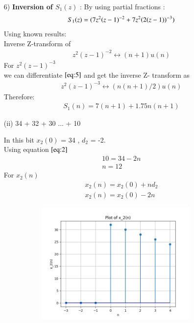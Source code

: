 \documentclass[journal,12pt,twocolumn]{IEEEtran}
\theoremstyle{remark}
\begin{document}
\begin{enumerate}
    \item[6)]
\textbf{Inversion of $S_1(z)$} :
By using partial fractions :
\begin{align}
    S_1(z) = \notag(7z^2(z-1)^{-2} + 7z^2(2(z-1))^{-3}) 
\end{align}
Using known results:\\
  Inverse Z-transform of
\begin{align}
        z^2(z-1)^{-2} \leftrightarrow (n+1)u(n)\label{eq:5}
\end{align}
    For $z^2(z-1)^{-3}$\\
    
    we can differentiate $\eqref{eq:5}$ and get the inverse Z- transform as 
    \begin{align}
          z^2(z-1)^{-3} \leftrightarrow (n(n+1)/2)u(n) \label{eq:7}
    \end{align}
    Therefore:
\begin{align}
 S_1(n) = 7(n+1) + 1.75n(n+1)   
\end{align}

    











\vspace{0.5cm}
\item[(ii)]
 34 + 32 + 30 ... + 10\vspace{0.05cm}
\vspace{0.2cm}

In this bit  $x_2(0)$ = 34 , $d_2$ = -2.\\

Using equation $\eqref{eq:2}$
\begin{align}
     10 = 34 -2n\\
     n=12 
     \end{align}
For $x_2(n)$
\begin{align}
x_2(n) = x_2(0) + nd_2\\
x_2(n) = x_2(0) -2n
\end{align}

\begin{figure}[!ht]
\centering
  \graphicspath{ {figs/} }
\includegraphics[width=10cm, height=6cm]{graph_2}
\captionsetup{Graph:2 $x_2(n)$ vs n }
\label{graph:3}
\end{figure}


\end{enumerate}
\end{document}
